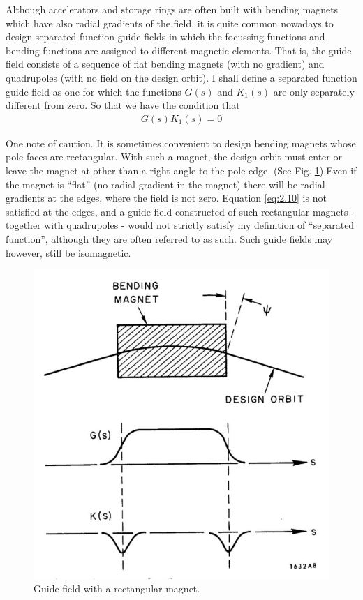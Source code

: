 Although accelerators and storage rings are often built with bending magnets which have also radial gradients of the field, it is quite common nowadays to design separated function guide fields in which the focussing functions and bending functions are assigned to different magnetic elements. That is, the guide field consists of a sequence of flat bending magnets (with no gradient) and quadrupoles (with no field on the design orbit). I shall define a separated function guide field as one for which the functions $G(s)$ and $K_1(s)$ are only separately different from zero. So that we have the condition that
\begin{align}
	G(s)K_1(s) = 0\label{eq:2.10}
\end{align}

One note of caution. It is sometimes convenient to design bending magnets whose pole faces are rectangular. With such a magnet, the design orbit must enter or leave the magnet at other than a right angle to the pole edge. (See Fig. \ref{fig:fig8}).Even if the magnet is “flat” (no radial gradient in the magnet) there will be radial gradients at the edges, where the field is not zero. Equation \eqref{eq:2.10} is not satisfied at the edges, and a guide field constructed of such rectangular magnets - together with quadrupoles - would not strictly satisfy my definition of ``separated function'', although they are often referred to as such. Such guide fields may however, still be isomagnetic.

\begin{figure}[!htb]
	\centering
	\includegraphics[width=0.6\linewidth]{./Figuras/fig08.jpeg}
	\caption{Guide field with a rectangular magnet.}
	\label{fig:fig8}
\end{figure}
